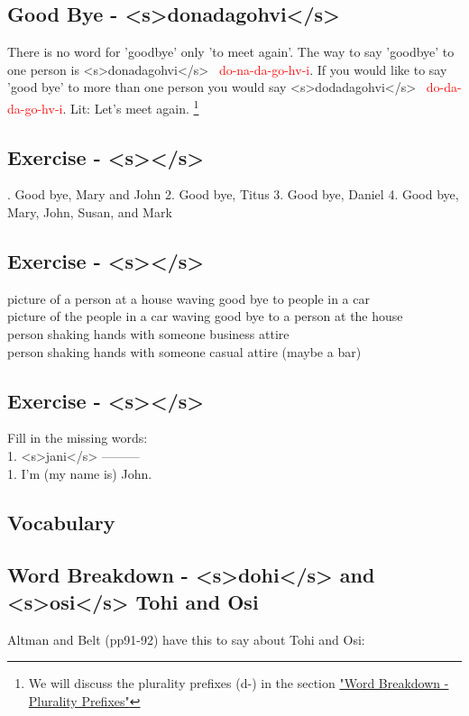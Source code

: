 \subsection{Good Bye - <s>donadagohvi</s>}
There is no word for 'goodbye' only 'to meet again'. The way to say 'goodbye' to one person is <s>donadagohvi</s> \  \textcolor{red}{do-na-da-go-hv-i}. If you would like to say 'good bye' to more than one person you would say <s>dodadagohvi</s> \ \textcolor{red}{do-da-da-go-hv-i}.  Lit: Let's meet again. \footnote{We will discuss the plurality prefixes (d-) in the section \hyperref[sec:wordBreakdownPluralityPrefixes]{"Word Breakdown - Plurality Prefixes"}}

\subsection{Exercise - <s></s>}
. Good bye, Mary and John 2. Good bye, Titus 3. Good bye, Daniel 4. Good
bye, Mary, John, Susan, and Mark\\

\subsection{Exercise - <s></s>}
\noindent picture of a person at a house waving good bye to people in a car \\
\noindent picture of the people in a car waving good bye to a person at the house\\
\noindent person shaking hands with someone business attire\\
\noindent person shaking hands with someone casual attire (maybe a bar)

\subsection{Exercise - <s></s>}
Fill in the missing words:\\
1. <s>jani</s> ---------\\
1. I'm (my name is) John.

\subsection{Vocabulary}


\subsection{Word Breakdown - <s>dohi</s> and <s>osi</s> Tohi and Osi}
\label{sec:wordBreakdownTohiOsi}
Altman and Belt (pp91-92) have this to say about Tohi and Osi:

